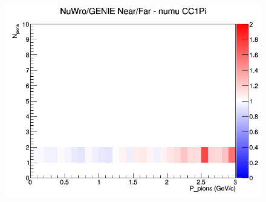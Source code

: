 \documentclass[12pt]{article}
\begin{document}
\begin{figure}[h]
\endminipage
{}
\includegraphics[width=\linewidth]{N_P/nominal/pions/ratios/CC1Pi_NuWro_GENIE_numu_NF_N_P.png}
\endminipage
\newline
\end{figure}
\clearpage
\end{document}
